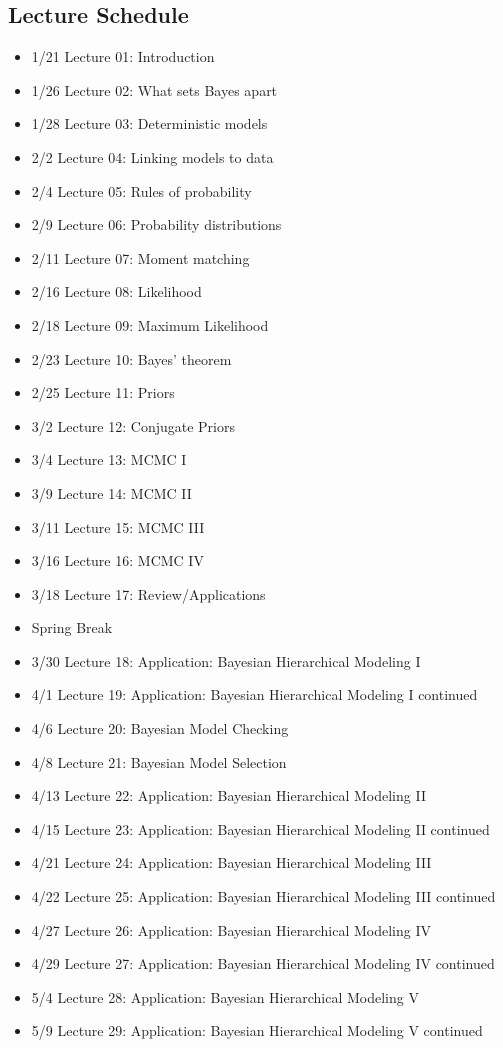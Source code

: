 \documentclass[11pt, a4paper]{article}
\begin{document}
\subsection*{Lecture Schedule}
\begin{itemize}
\item 1/21 Lecture 01: Introduction
\item 1/26 Lecture 02: What sets Bayes apart
\item 1/28 Lecture 03: Deterministic models
\item 2/2 Lecture 04: Linking models to data
\item 2/4 Lecture 05: Rules of probability
\item 2/9 Lecture 06: Probability distributions 
\item 2/11 Lecture 07: Moment matching
\item 2/16 Lecture 08: Likelihood
\item 2/18 Lecture 09: Maximum Likelihood
\item 2/23 Lecture 10: Bayes' theorem
\item 2/25 Lecture 11: Priors
\item 3/2 Lecture 12: Conjugate Priors
\item 3/4 Lecture 13: MCMC I
\item 3/9 Lecture 14: MCMC II
\item 3/11 Lecture 15: MCMC III
\item 3/16 Lecture 16: MCMC IV
\item 3/18 Lecture 17: Review/Applications
\item Spring Break
\item 3/30 Lecture 18: Application: Bayesian Hierarchical Modeling I
\item 4/1 Lecture 19: Application: Bayesian Hierarchical Modeling I continued
\item 4/6 Lecture 20: Bayesian Model Checking 
\item 4/8 Lecture 21: Bayesian Model Selection
\item 4/13 Lecture 22: Application: Bayesian Hierarchical Modeling II
\item 4/15 Lecture 23: Application: Bayesian Hierarchical Modeling II continued
\item  4/21 Lecture 24:  Application: Bayesian Hierarchical Modeling III
\item 4/22 Lecture 25:  Application: Bayesian Hierarchical Modeling III continued
\item 4/27 Lecture 26:  Application: Bayesian Hierarchical Modeling IV
\item 4/29 Lecture 27:  Application: Bayesian Hierarchical Modeling IV continued
\item 5/4 Lecture 28:  Application: Bayesian Hierarchical Modeling V
\item 5/9 Lecture 29:  Application: Bayesian Hierarchical Modeling V continued
\end{itemize}
\end{document}
